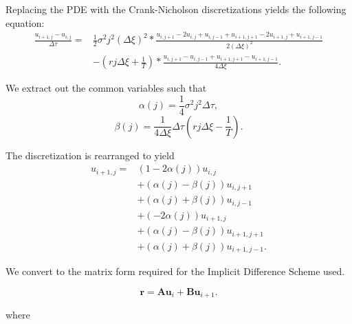 \documentclass{article}
\begin{document}
Replacing the PDE with the Crank-Nicholson discretizations yields the following equation:
\begin{equation}
  \begin{split}
    \frac{u_{i+1, j} - u_{i, j}}{\Delta\tau} = & \frac{1}{2}\sigma^2j^2(\Delta\xi)^2 * \frac{u_{i, j+1} - 2u_{i, j} + u_{i, j-1} + u_{i + 1, j+1} - 2 u_{i+1, j} + u_{i+1, j-1}}{2(\Delta\xi)^2} \\ & - (rj\Delta\xi + \frac{1}{T}) * \frac{u_{i, j+1} - u_{i,j-1} +u_{i+1, j+1} - u_{i+1, j-1}}{4\Delta\xi}.
  \end{split}
\end{equation}

We extract out the common variables such that
\begin{equation}
  \alpha(j) = \frac{1}{4}\sigma^2j^2\Delta\tau,
\end{equation}
\begin{equation}
  \beta(j) = \frac{1}{4\Delta\xi}\Delta\tau(rj\Delta\xi - \frac{1}{T}).
\end{equation}

The discretization is rearranged to yield
\begin{equation}
  \begin{split}
    u_{i+1, j} = & (1-2\alpha(j))u_{i, j} \\
    & + (\alpha(j)-\beta(j))u_{i, j+1}\\
    & + (\alpha(j)+\beta(j))u_{i, j-1}\\
    & + (-2\alpha(j))u_{i+1, j}\\
    & + (\alpha(j)-\beta(j))u_{i+1, j+1}\\
    & + (\alpha(j)+\beta(j))u_{i+1, j-1}.
  \end{split}
\end{equation}

We convert to the matrix form required for the Implicit Difference Scheme used.

\begin{equation}
  \textbf{r} = \textbf{Au}_{i} + \textbf{Bu}_{i+1}.
\end{equation}

where
\end{document}
